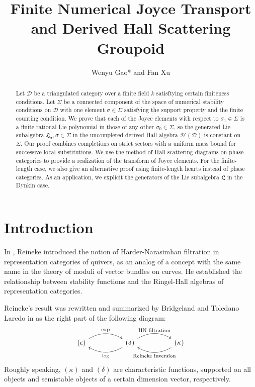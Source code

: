 \documentclass[a4paper,12pt]{amsart}
\title[Numerical Joyce Transport and Derived Scattering Groupoid]{
Finite Numerical Joyce Transport and Derived Hall Scattering Groupoid
}
\author[Wenyu Gao and Fan Xu]{
Wenyu Gao* and Fan Xu
}
\numberwithin{equation}{section}
\newcommand{\1}{\mathbf{1}}
\begin{document}
\begin{abstract}
Let $\mathcal{D}$ be a triangulated category over a finite field $k$ satisftying certain finiteness conditions. Let $\Sigma$ be a connected component of the space of numerical stability conditions on $\mathcal{D}$ with one element $\sigma\in\Sigma$ satisfying the support property and the finite counting condition. We prove that each of the Joyce elements with respect to $\sigma_1\in\Sigma$ is a finite rational Lie polynomial in those of any other $\sigma_0\in\Sigma$, so the generated Lie subalgebra $\mathfrak{L}_\sigma,\sigma\in\Sigma$ in the uncompleted derived Hall algebra $\mathcal{H}(\mathcal{D})$ is constant on $\Sigma$. Our proof combines completions on strict sectors with a uniform mass bound for successive local substitutions. We use the method of Hall scattering diagrams on phase categories to provide a realization of the transform of Joyce elements. For the finite-length case, we also give an alternative proof using finite-length hearts instead of phase categories. As an application, we explicit the generators of the Lie subalgebra $\mathfrak{L}$ in the Dynkin case.
\end{abstract}
\maketitle
\section{Introduction}
    In \cite{Rei2003}, Reineke introduced the notion of Harder-Narasimhan filtration in representation categories of quivers, as an analog of a concept with the same name in the theory of moduli of vector bundles on curves. He established the relationship between stability functions and the Ringel-Hall algebras of representation categories. 

    Reineke's result was rewritten and summarized by Bridgeland and Toledano Laredo in \cite{BT2012} as the right part of the following diagram:
    \begin{equation}\label{BT diagram}
    \begin{tikzcd}
(\epsilon) \arrow[rr, "\exp", bend left] &  & (\delta) \arrow[ll, "\log", bend left] \arrow[rr, "\text{HN filtration}", bend left] &  & (\kappa) \arrow[ll, "\text{Reineke inversion}", bend left]
\end{tikzcd}
\end{equation}
Roughly speaking, $(\kappa)$ and $(\delta)$ are characteristic functions, supported on all objects and semistable objects of a certain dimension vector, respectively.
\end{document}
